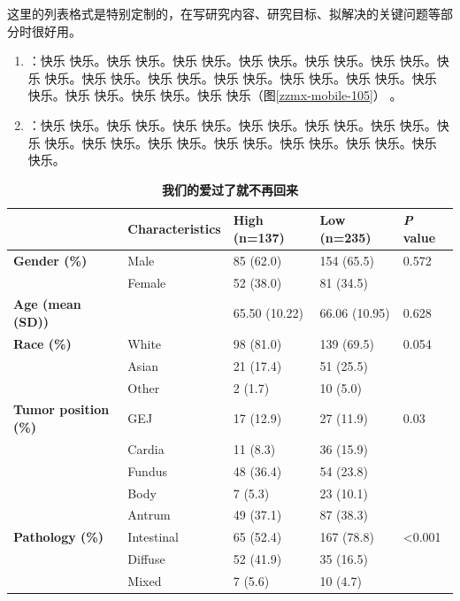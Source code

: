 这里的列表格式是特别定制的，在写研究内容、研究目标、拟解决的关键问题等部分时很好用。

\begin{enumerate}
    \item {}：快乐 快乐。快乐 快乐。快乐 快乐。快乐 快乐。快乐 快乐。快乐 快乐。快乐 快乐。快乐 快乐。快乐 快乐。快乐 快乐。快乐 快乐。快乐 快乐。快乐 快乐。快乐 快乐。快乐 快乐。快乐 快乐（图\ref{zzmx-mobile-105}） 。
    \item {}：快乐 快乐。快乐 快乐。快乐 快乐。快乐 快乐。快乐 快乐。快乐 快乐。快乐 快乐。快乐 快乐。快乐 快乐。快乐 快乐。快乐 快乐。快乐 快乐。快乐 快乐。
\end{enumerate}


\begin{table}[htbp]
    \centering
    \fontsize{11}{11}\selectfont
    \caption{\textbf{我们的爱过了就不再回来}}
    \begin{tabular}{lllll}
    \toprule
            & \textbf{Characteristics} & \textbf{High (n=137)} & \textbf{Low (n=235)} & \textbf{\textit{P} value} \\
    \toprule
    \textbf{Gender (\%)} & Male  & 85 (62.0) & 154 (65.5) & 0.572 \\
            & Female & 52 (38.0) & 81 (34.5) &  \\
    \textbf{Age (mean (SD))} &       & 65.50 (10.22) & 66.06 (10.95) & 0.628 \\
    \textbf{Race (\%)} & White & 98 (81.0) & 139 (69.5) & 0.054 \\
            & Asian & 21 (17.4) & 51 (25.5) &  \\
            & Other & 2 (1.7) & 10 (5.0) &  \\
    \textbf{Tumor position (\%)} & GEJ   & 17 (12.9) & 27 (11.9) & 0.03 \\
            & Cardia & 11 (8.3) & 36 (15.9) &  \\
            & Fundus & 48 (36.4) & 54 (23.8) &  \\
            & Body  & 7 (5.3) & 23 (10.1) &  \\
            & Antrum & 49 (37.1) & 87 (38.3) &  \\
    \textbf{Pathology (\%)} & Intestinal & 65 (52.4) & 167 (78.8) & <0.001 \\
            & Diffuse & 52 (41.9) & 35 (16.5) &  \\
            & Mixed & 7 (5.6) & 10 (4.7) &  \\

\end{tabular}
\end{table}
